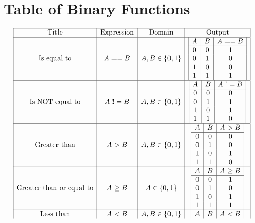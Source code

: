\documentclass[11pt]{article}
\begin{document}
\section{Table of Binary Functions}
\[
\begin{array}{|c|c|c|c|}
\hline
\text{Title} & \text{Expression} & \text{Domain} & \text{Output} \\
\hline
\text{Is equal to} & A == B & A,B \in \{0,1\} & \begin{array}{|c|c|c|}
A & B & A == B \\
\hline
0 & 0 & 1 \\
0 & 1 & 0 \\
1 & 0 & 0 \\
1 & 1 & 1 \\
\end{array} \\
\hline
\text{Is NOT equal to} & A \hspace{1mm} != B & A,B \in \{0,1\} & \begin{array}{|c|c|c|}
A & B & A \hspace{1mm} != B \\
\hline
0 & 0 & 0 \\
0 & 1 & 1 \\
1 & 0 & 1 \\
1 & 1 & 0 \\
\end{array} \\
\hline
\text{Greater than} & A > B & A,B \in \{0,1\} & \begin{array}{|c|c|c|}
A & B & A > B \\
\hline
0 & 0 & 0 \\
0 & 1 & 0 \\
1 & 0 & 1 \\
1 & 1 & 0 \\
\end{array} \\
\hline
\text{Greater than or equal to} & A \geq B & A \in \{0,1\} & \begin{array}{|c|c|c|}
A & B & A \geq B \\
\hline
0 & 0 & 1 \\
0 & 1 & 0 \\
1 & 0 & 1 \\
1 & 1 & 1 \\
\end{array} \\
\hline
\text{Less than} & A < B & A, B \in \{0,1\} & \begin{array}{|c|c|c|}
A & B & A < B \\

\end{array}
\end{array}\]
\end{document}
